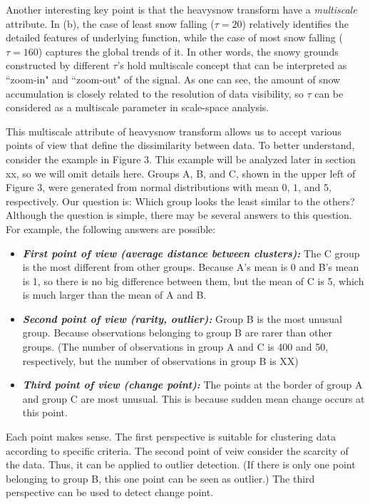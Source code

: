 \documentclass[preprint, review, 12pt]{article}
\theoremstyle{definition}
\theoremstyle{remark}
\begin{document}
\iffalse %
Another interesting key point is that the heavysnow transform have a \emph{multiscale} attribute. In (b), the case of least snow falling ($\tau=20$) relatively identifies the detailed features of underlying function, while the case of most snow falling ($\tau=160$) captures the global trends of it. In other words, the snowy grounds constructed by different $\tau$'s hold multiscale concept that can be interpreted as ``zoom-in" and ``zoom-out" of the signal. As one can see, the amount of snow accumulation is closely related to the resolution of data visibility, so $\tau$ can be considered as a multiscale parameter in scale-space analysis.

This multiscale attribute of heavysnow transform allows us to accept various points of view that define the dissimilarity between data. To better understand, consider the example in Figure 3. This example will be analyzed later in section xx, so we will omit details here. Groups A, B, and C, shown in the upper left of Figure 3, were generated from normal distributions with mean $0$, $1$, and $5$, respectively. Our question is:  
 Which group looks the least similar to the others? Although the question is simple, there may be several answers to this question. For example, the following answers are possible:
\begin{itemize}
\item \textbf{\it First point of view (average distance between clusters):} The C group is the most different from other groups. Because A's mean is 0 and B's mean is 1, so there is no big difference between them, but the mean of C is 5, which is much larger than the mean of A and B.
\item \textbf{\it Second point of view (rarity, outlier):} Group B is the most unusual group. Because observations belonging to group B are rarer than other groups. (The number of observations in group A and C is 400 and 50, respectively, but the number of observations in group B is XX)
\item \textbf{\it Third point of view (change point):} The points at the border of group A and group C are most unusual. This is because  sudden mean change occurs at this point.
\end{itemize}
Each point makes sense. The first perspective is suitable for clustering data according to specific criteria. The second point of veiw consider the scarcity of the data. Thus, it can be applied to outlier detection. (If there is only one point belonging to group B, this one point can be seen as outlier.) The third perspective can be used to detect change point. 
\end{document}
